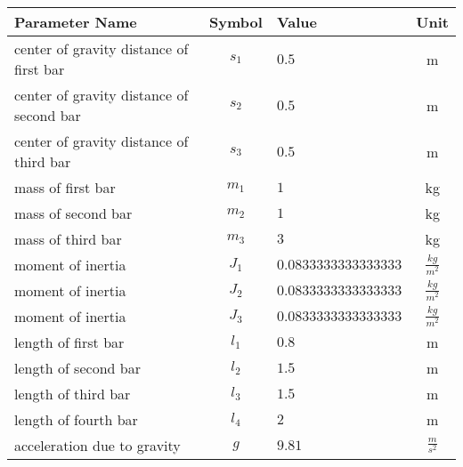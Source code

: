 \begin{tabular}{lclc}
\hline
 Parameter Name                           &  Symbol  & Value                &       Unit       \\
\hline
 center of gravity distance of first bar  & $s_{1}$  & $0.5$                &        m         \\
 center of gravity distance of second bar & $s_{2}$  & $0.5$                &        m         \\
 center of gravity distance of third bar  & $s_{3}$  & $0.5$                &        m         \\
 mass of first bar                        & $m_{1}$  & $1$                  &        kg        \\
 mass of second bar                       & $m_{2}$  & $1$                  &        kg        \\
 mass of third bar                        & $m_{3}$  & $3$                  &        kg        \\
 moment of inertia                        & $J_{1}$  & $0.0833333333333333$ & $\frac{kg}{m^2}$ \\
 moment of inertia                        & $J_{2}$  & $0.0833333333333333$ & $\frac{kg}{m^2}$ \\
 moment of inertia                        & $J_{3}$  & $0.0833333333333333$ & $\frac{kg}{m^2}$ \\
 length of first bar                      & $l_{1}$  & $0.8$                &        m         \\
 length of second bar                     & $l_{2}$  & $1.5$                &        m         \\
 length of third bar                      & $l_{3}$  & $1.5$                &        m         \\
 length of fourth bar                     & $l_{4}$  & $2$                  &        m         \\
 acceleration due to gravity              &   $g$    & $9.81$               & $\frac{m}{s^2}$  \\
\hline
\end{tabular}
